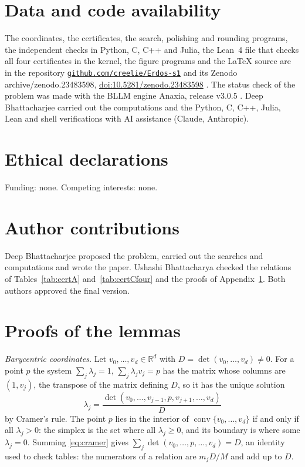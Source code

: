 \documentclass[aps,prd,twocolumn,superscriptaddress,nofootinbib,longbibliography,floatfix,showkeys,amsmath,amssymb,10pt]{revtex4-2}
\theoremstyle{plain}
\theoremstyle{definition}
\theoremstyle{plain}
\newcommand{\R}{\mathbb{R}}
\newcommand{\conv}{\operatorname{conv}}
\newcommand{\codeDOI}{\href{https://github.com/creelie/Erdos-s1}{\nolinkurl{github.com/creelie/Erdos-s1}}}
\def\zenodoID{10.5281/zenodo.23483598}%
\newcommand{\zenodoDOI}{\ifx\zenodoID\empty\else, \href{https://doi.org/\zenodoID}{doi:\zenodoID}\fi}
\begin{document}
\section*{Data and code availability}
The coordinates, the certificates, the search, polishing and rounding programs, the independent checks in Python, C, C++ and Julia, the Lean~4 file that checks all four certificates in the kernel, the figure programs and the \LaTeX{} source are in the repository \codeDOI{} and its Zenodo archive\zenodoDOI{} \cite{BB26z}. The status check of the problem was made with the BLLM engine Anaxia, release v3.0.5 \cite{Ana26}. Deep Bhattacharjee carried out the computations and the Python, C, C++, Julia, Lean and shell verifications with AI assistance (Claude, Anthropic).

\section*{Ethical declarations}
Funding: none. Competing interests: none.

\section*{Author contributions}
Deep Bhattacharjee proposed the problem, carried out the searches and computations and wrote the paper. Ushashi Bhattacharya checked the relations of Tables~\ref{tab:certA} and~\ref{tab:certCfour} and the proofs of Appendix~\ref{app:proofs}. Both authors approved the final version.

\appendix

\section{Proofs of the lemmas}\label{app:proofs}


\emph{Barycentric coordinates.} Let $v_0,\dots,v_d\in\R^d$ with $D=\det(v_0,\dots,v_d)\ne0$. For a point $p$ the system $\sum_j\lambda_j=1$, $\sum_j\lambda_jv_j=p$ has the matrix whose columns are $(1,v_j)$, the transpose of the matrix defining $D$, so it has the unique solution
\begin{equation}\label{eq:cramer}
\lambda_j=\frac{\det(v_0,\dots,v_{j-1},p,v_{j+1},\dots,v_d)}{D}
\end{equation}
by Cramer's rule. The point $p$ lies in the interior of $\conv\{v_0,\dots,v_d\}$ if and only if all $\lambda_j>0$: the simplex is the set where all $\lambda_j\ge0$, and its boundary is where some $\lambda_j=0$. Summing \eqref{eq:cramer} gives $\sum_j\det(v_0,\dots,p,\dots,v_d)=D$, an identity used to check tables: the numerators of a relation are $m_jD/M$ and add up to $D$.
\end{document}
